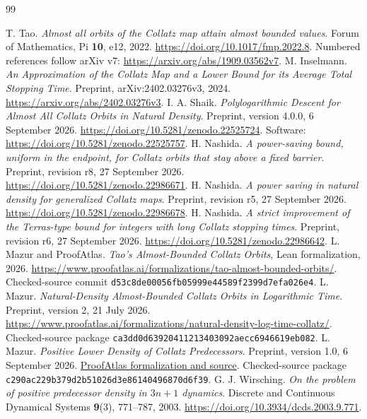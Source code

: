 \documentclass[11pt,a4paper]{article}
\begin{document}
\begin{thebibliography}{99}\small\raggedright
{} T. Tao.
\emph{Almost all orbits of the Collatz map attain almost bounded values}.
Forum of Mathematics, Pi \textbf{10}, e12, 2022.
\url{https://doi.org/10.1017/fmp.2022.8}.
Numbered references follow arXiv v7:
\url{https://arxiv.org/abs/1909.03562v7}.
 M. Inselmann.
\emph{An Approximation of the Collatz Map and a Lower Bound for its
Average Total Stopping Time}.
Preprint, arXiv:2402.03276v3, 2024.
\url{https://arxiv.org/abs/2402.03276v3}.
 I. A. Shaik.
\emph{Polylogarithmic Descent for Almost All Collatz Orbits in Natural Density}.
Preprint, version 4.0.0, 6 September 2026.
\url{https://doi.org/10.5281/zenodo.22525724}.
Software: \url{https://doi.org/10.5281/zenodo.22525757}.
 H. Nashida.
\emph{A power-saving bound, uniform in the endpoint, for Collatz orbits
that stay above a fixed barrier}.
Preprint, revision r8, 27 September 2026.
\url{https://doi.org/10.5281/zenodo.22986671}.
 H. Nashida.
\emph{A power saving in natural density for generalized Collatz maps}.
Preprint, revision r5, 27 September 2026.
\url{https://doi.org/10.5281/zenodo.22986678}.
 H. Nashida.
\emph{A strict improvement of the Terras-type bound for integers with
long Collatz stopping times}.
Preprint, revision r6, 27 September 2026.
\url{https://doi.org/10.5281/zenodo.22986642}.
 L. Mazur and ProofAtlas.
\emph{Tao's Almost-Bounded Collatz Orbits}, Lean formalization, 2026.
\url{https://www.proofatlas.ai/formalizations/tao-almost-bounded-orbits/}.
Checked-source commit \texttt{d53c8de00056fb05999e44589f2399d7efa026e4}.
 L. Mazur.
\emph{Natural-Density Almost-Bounded Collatz Orbits in Logarithmic Time}.
Preprint, version 2, 21 July 2026.
\url{https://www.proofatlas.ai/formalizations/natural-density-log-time-collatz/}.
Checked-source package \texttt{ca3dd0d63920411213403092aecc6946619eb082}.
 L. Mazur.
\emph{Positive Lower Density of Collatz Predecessors}.
Preprint, version 1.0, 6 September 2026.
\href{https://www.proofatlas.ai/formalizations/positive-lower-density-collatz-predecessors/}{ProofAtlas formalization and source}.
Checked-source package \texttt{c290ac229b379d2b51026d3e86140496870d6f39}.
 G. J. Wirsching.
\emph{On the problem of positive predecessor density in \(3n+1\) dynamics}.
Discrete and Continuous Dynamical Systems \textbf{9}(3), 771--787, 2003.
\url{https://doi.org/10.3934/dcds.2003.9.771}.

\end{thebibliography}
\end{document}
